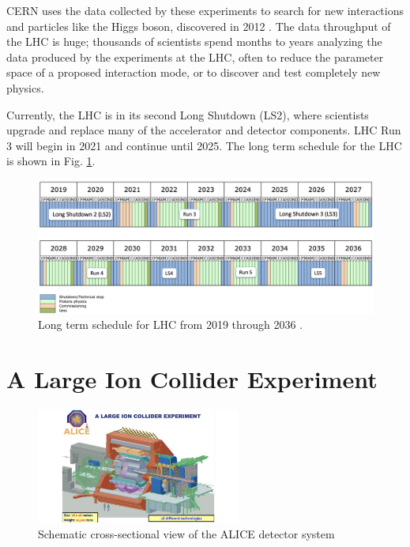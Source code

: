 CERN uses the data collected by these experiments to search for new interactions and particles like the Higgs boson, discovered in 2012 \cite{Higgs}. The data throughput of the LHC is huge; thousands of scientists spend months to years analyzing the data produced by the experiments at the LHC, often to reduce the parameter space of a proposed interaction mode, or to discover and test completely new physics.

Currently, the LHC is in its second Long Shutdown (LS2), where scientists upgrade and replace many of the accelerator and detector components. LHC Run 3 will begin in 2021 and continue until 2025. The long term schedule for the LHC is shown in Fig. \ref{fig:CERN_Timelne}.
\begin{figure}[H]
    \centering
    \includegraphics[width=\textwidth]{figures/CERN/LHC_Timeline.png}
    \caption{Long term schedule for LHC from 2019 through 2036 \cite{CernLongTermSchedule}.}
    \label{fig:CERN_Timelne}
\end{figure}

\section{A Large Ion Collider Experiment}

\begin{figure}[H]
    \centering
    \includegraphics[width=0.6\textwidth]{figures/ALICE/alice_detector.jpg}
    \caption{Schematic cross-sectional view of the ALICE detector system \cite{ALICE_Schematic}}
    \label{fig:ALICE_DETECTOR}
\end{figure}

